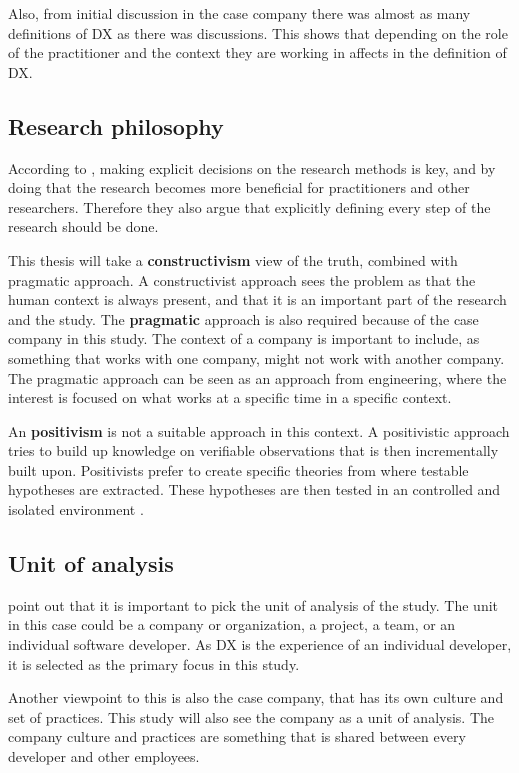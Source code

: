 \documentclass[english, 12pt, a4paper, sci, utf8, a-1b, online]{aaltothesis}
\begin{document}
Also, from initial discussion in the case company there was almost as many definitions of DX as there was discussions. This shows that depending on the role of the practitioner and the context they are working in affects in the definition of DX.

\subsection{Research philosophy} \label{section:research-philosophy}

According to \cite{easterbrook2008selecting}, making explicit decisions on the research methods is key, and by doing that the research becomes more beneficial for practitioners and other researchers. Therefore they also argue that explicitly defining every step of the research should be done.

This thesis will take a \textbf{constructivism} view of the truth, combined with pragmatic approach. A constructivist approach sees the problem as that the human context is always present, and that it is an important part of the research and the study. The \textbf{pragmatic} approach is also required because of the case company in this study. The context of a company is important to include, as something that works with one company, might not work with another company. The pragmatic approach can be seen as an approach from engineering, where the interest is focused on what works at a specific time in a specific context.

An \textbf{positivism} is not a suitable approach in this context. A positivistic approach tries to build up knowledge on verifiable observations that is then incrementally built upon. Positivists prefer to create specific theories from where testable hypotheses are extracted. These hypotheses are then tested in an controlled and isolated environment \citep{easterbrook2008selecting}.

\subsection{Unit of analysis}

\cite{easterbrook2008selecting} point out that it is important to pick the unit of analysis of the study. The unit in this case could be a company or organization, a project, a team, or an individual software developer. As DX is the experience of an individual developer, it is selected as the primary focus in this study.

Another viewpoint to this is also the case company, that has its own culture and set of practices. This study will also see the company as a unit of analysis. The company culture and practices are something that is shared between every developer and other employees.
\end{document}
